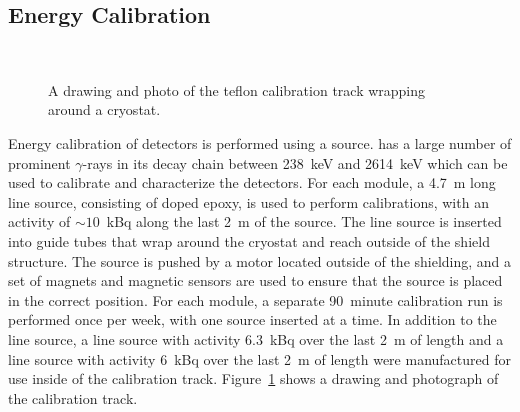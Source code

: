 \documentclass[/main.tex]{subfiles}
\begin{document}
\subsection{Energy Calibration} \label{sec:calibration}
\begin{figure}
  \centering
  ~
  \caption[Calibration track]{\label{fig:caltrack}
    A drawing and photo of the teflon calibration track wrapping around a cryostat.
  }
\end{figure}
Energy calibration of detectors is performed using a  source\cite{mjdcalibration}.
 has a large number of prominent $\gamma$-rays in its decay chain between 238~keV and 2614~keV which can be used to calibrate and characterize the detectors.
For each module, a 4.7~m long line source, consisting of  doped epoxy, is used to perform calibrations, with an activity of ${\sim}10$~kBq along the last 2~m of the source.
The line source is inserted into guide tubes that wrap around the cryostat and reach outside of the shield structure.
The source is pushed by a motor located outside of the shielding, and a set of magnets and magnetic sensors are used to ensure that the source is placed in the correct position.
For each module, a separate 90~minute calibration run is performed once per week, with one source inserted at a time.
In addition to the  line source, a  line source with activity 6.3~kBq over the last 2~m of length and a  line source with activity 6~kBq over the last 2~m of length were manufactured for use inside of the calibration track.
Figure~\ref{fig:caltrack} shows a drawing and photograph of the calibration track.
\end{document}
